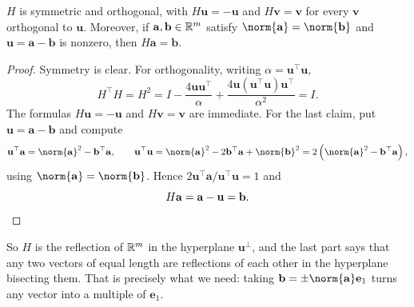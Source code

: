 \documentclass[a4paper]{scrartcl}
\begin{document}
\begin{proposition}
  $H$ is symmetric and orthogonal, with $H\mathbf{u} = -\mathbf{u}$ and $H\mathbf{v} = \mathbf{v}$ for every $\mathbf{v}$ orthogonal to $\mathbf{u}$. Moreover, if $\mathbf{a},\mathbf{b}\in\mathbb{R}^m$ satisfy $\norm{\mathbf a} = \norm{\mathbf b}$ and $\mathbf{u} = \mathbf{a}-\mathbf{b}$ is nonzero, then $H\mathbf{a} = \mathbf{b}$.
\end{proposition}
\begin{proof}
  Symmetry is clear. For orthogonality, writing $\alpha = \mathbf{u}^\top\mathbf{u}$,
  $$
  H^\top H = H^2 = I - \frac{4\mathbf{u}\mathbf{u}^\top}{\alpha} + \frac{4\mathbf{u}(\mathbf{u}^\top\mathbf{u})\mathbf{u}^\top}{\alpha^2} = I .
  $$
  The formulas $H\mathbf u = -\mathbf u$ and $H\mathbf v = \mathbf v$ are immediate. For the last claim, put $\mathbf{u} = \mathbf a - \mathbf b$ and compute
  $$
  \mathbf{u}^\top\mathbf{a} = \norm{\mathbf a}^2 - \mathbf b^\top\mathbf a, \qquad \mathbf{u}^\top\mathbf{u} = \norm{\mathbf a}^2 - 2\mathbf b^\top\mathbf a + \norm{\mathbf b}^2 = 2\left(\norm{\mathbf a}^2 - \mathbf b^\top\mathbf a\right),
  $$
  using $\norm{\mathbf a} = \norm{\mathbf b}$. Hence $2\mathbf{u}^\top\mathbf a/\mathbf u^\top\mathbf u = 1$ and
  $$
  H\mathbf a = \mathbf a - \mathbf u = \mathbf b. \qedhere
  $$
\end{proof}

So $H$ is the reflection of $\mathbb{R}^m$ in the hyperplane $\mathbf{u}^\perp$, and the last part says that any two vectors of equal length are reflections of each other in the hyperplane bisecting them. That is precisely what we need: taking $\mathbf b = \pm\norm{\mathbf a}\mathbf e_1$ turns any vector into a multiple of $\mathbf e_1$.

\begin{center}
\end{center}
\end{document}
